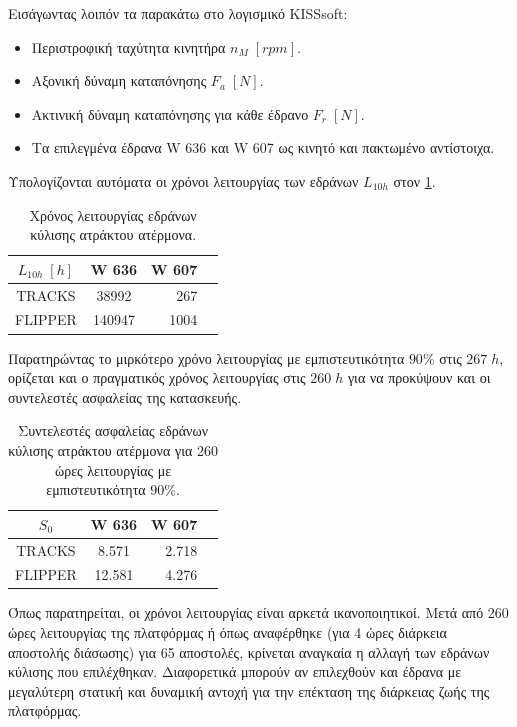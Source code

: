 Εισάγωντας λοιπόν τα παρακάτω στο λογισμικό KISSsoft:
\begin{itemize}
    \item Περιστροφική ταχύτητα κινητήρα $n_M\; [rpm]$.
    \item Αξονική δύναμη καταπόνησης $F_a\; [N]$.
    \item Ακτινική δύναμη καταπόνησης για κάθε έδρανο $F_r\; [N]$.
    \item Τα επιλεγμένα έδρανα W 636 και W 607 ως κινητό και πακτωμένο αντίστοιχα.
\end{itemize}

Υπολογίζονται αυτόματα οι χρόνοι λειτουργίας των εδράνων $L_{10h}$ στον \ref{tab:L10h}.

\begin{table}[H]
    \centering
\begin{tabular}{|c|c|r|r|}
\hline
\rowcolor{YellowGreen}
$L_{10h}\; [h]$ & W 636 & W 607\\
\hline
TRACKS & 38992 & 267\\
\hline
FLIPPER & 140947 & 1004\\
\hline
\end{tabular}
    \caption{Χρόνος λειτουργίας εδράνων κύλισης ατράκτου ατέρμονα.}
    \label{tab:L10h}
\end{table}



Παρατηρώντας το μιρκότερο χρόνο λειτουργίας με εμπιστευτικότητα $90\%$ στις $267\; h$, ορίζεται και ο πραγματικός χρόνος λειτουργίας στις $260\;h$ για να προκύψουν και οι συντελεστές ασφαλείας της κατασκευής.

\begin{table}[H]
    \centering
\begin{tabular}{|c|c|r|r|}
\hline
\rowcolor{YellowGreen}
$S_0$ & W 636 & W 607\\
\hline
TRACKS & 8.571 & 2.718\\
\hline
FLIPPER & 12.581 & 4.276\\
\hline
\end{tabular}
    \caption{Συντελεστές ασφαλείας εδράνων κύλισης ατράκτου ατέρμονα για 260 ώρες λειτουργίας με εμπιστευτικότητα $90\%$.}
    \label{tab:s0}
\end{table}



Όπως παρατηρείται, οι χρόνοι λειτουργίας είναι αρκετά ικανοποιητικοί. Μετά από 260 ώρες λειτουργίας της πλατφόρμας ή όπως αναφέρθηκε (για 4 ώρες διάρκεια αποστολής διάσωσης) για 65 αποστολές, κρίνεται αναγκαία η αλλαγή των εδράνων κύλισης που επιλέχθηκαν. Διαφορετικά μπορούν αν επιλεχθούν και έδρανα με μεγαλύτερη στατική και δυναμική αντοχή για την επέκταση της διάρκειας ζωής της πλατφόρμας.

